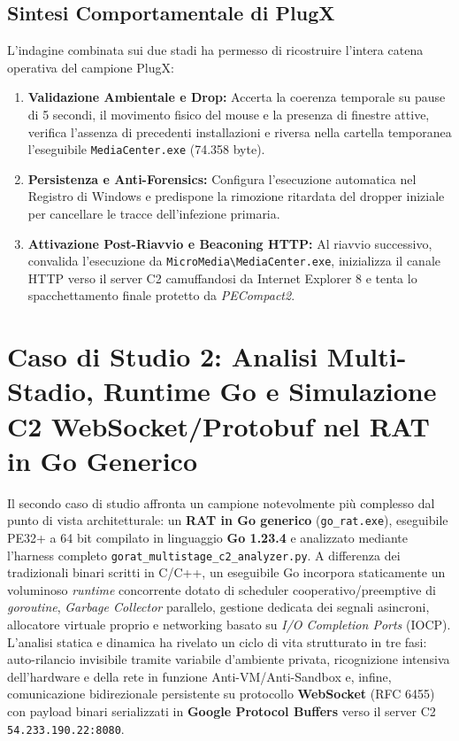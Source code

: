 \documentclass[11pt, a4paper]{article}
\begin{document}
\subsection{Sintesi Comportamentale di PlugX}

L'indagine combinata sui due stadi ha permesso di ricostruire l'intera catena operativa del campione PlugX:
\begin{enumerate}
	\item \textbf{Validazione Ambientale e Drop:} Accerta la coerenza temporale su pause di 5 secondi, il movimento fisico del mouse e la presenza di finestre attive, verifica l'assenza di precedenti installazioni e riversa nella cartella temporanea l'eseguibile \texttt{Media\allowbreak{}Center.\allowbreak{}exe} (74.358 byte).
	\item \textbf{Persistenza e Anti-Forensics:} Configura l'esecuzione automatica nel Registro di Windows e predispone la rimozione ritardata del dropper iniziale per cancellare le tracce dell'infezione primaria.
	\item \textbf{Attivazione Post-Riavvio e Beaconing HTTP:} Al riavvio successivo, convalida l'esecuzione da \texttt{Micro\allowbreak{}Media\textbackslash\allowbreak{}Media\allowbreak{}Center.\allowbreak{}exe}, inizializza il canale HTTP verso il server C2 camuffandosi da Internet Explorer 8 e tenta lo spacchettamento finale protetto da \textit{PECompact2}.
\end{enumerate}

\section{Caso di Studio 2: Analisi Multi-Stadio, Runtime Go e Simulazione C2 WebSocket/Protobuf nel RAT in Go Generico}

Il secondo caso di studio affronta un campione notevolmente pi\`u complesso dal punto di vista architetturale: un \textbf{RAT in Go generico} (\texttt{go\_rat.exe}), eseguibile PE32+ a 64 bit compilato in linguaggio \textbf{Go 1.23.4} e analizzato mediante l'harness completo \texttt{gorat\_\allowbreak{}multistage\_\allowbreak{}c2\_\allowbreak{}analyzer.\allowbreak{}py}. A differenza dei tradizionali binari scritti in C/C++, un eseguibile Go incorpora staticamente un voluminoso \textit{runtime} concorrente dotato di scheduler cooperativo/preemptive di \textit{goroutine}, \textit{Garbage Collector} parallelo, gestione dedicata dei segnali asincroni, allocatore virtuale proprio e networking basato su \textit{I/O Completion Ports} (IOCP). L'analisi statica e dinamica ha rivelato un ciclo di vita strutturato in tre fasi: auto-rilancio invisibile tramite variabile d'ambiente privata, ricognizione intensiva dell'hardware e della rete in funzione Anti-VM/Anti-Sandbox e, infine, comunicazione bidirezionale persistente su protocollo \textbf{WebSocket} (RFC 6455) con payload binari serializzati in \textbf{Google Protocol Buffers} verso il server C2 \texttt{54.233.190.22:8080}.
\end{document}
